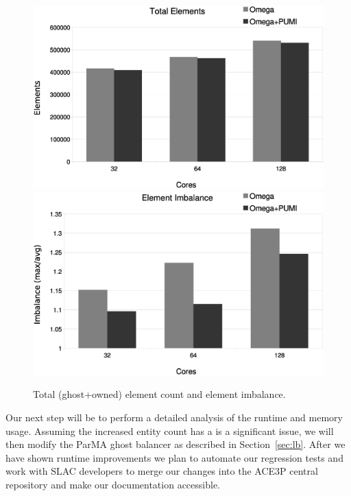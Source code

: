 \documentclass[a4paper]{article}
\begin{document}
\begin{figure}[ht]
\centering
  \includegraphics[width=\textwidth]{total-elms.eps} \\
  \includegraphics[width=\textwidth]{elm-imb.eps} \\
  \caption{\label{fig:elm} Total (ghost+owned) element count and element imbalance.}
\end{figure}

Our next step will be to perform a detailed analysis of the runtime and memory
usage.
Assuming the increased entity count has a is a significant issue, we will then modify
the ParMA ghost balancer as described in Section~\ref{sec:lb}.
After we have shown runtime improvements we plan to automate our regression
tests and work with SLAC developers to merge our changes into
the ACE3P central repository and make our documentation accessible.

\newpage 

\end{document}
